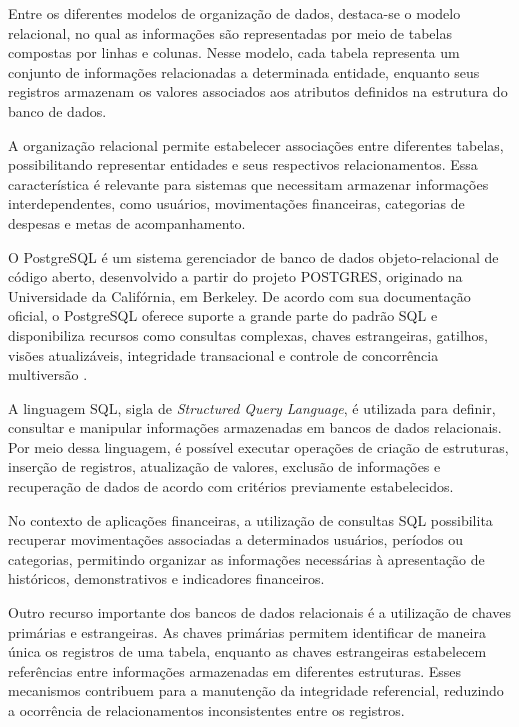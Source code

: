 Entre os diferentes modelos de organização de dados, destaca-se o modelo relacional, no qual as informações são representadas por meio de tabelas compostas por linhas e colunas. Nesse modelo, cada tabela representa um conjunto de informações relacionadas a determinada entidade, enquanto seus registros armazenam os valores associados aos atributos definidos na estrutura do banco de dados.

A organização relacional permite estabelecer associações entre diferentes tabelas, possibilitando representar entidades e seus respectivos relacionamentos. Essa característica é relevante para sistemas que necessitam armazenar informações interdependentes, como usuários, movimentações financeiras, categorias de despesas e metas de acompanhamento.

O PostgreSQL é um sistema gerenciador de banco de dados objeto-relacional de código aberto, desenvolvido a partir do projeto POSTGRES, originado na Universidade da Califórnia, em Berkeley. De acordo com sua documentação oficial, o PostgreSQL oferece suporte a grande parte do padrão SQL e disponibiliza recursos como consultas complexas, chaves estrangeiras, gatilhos, visões atualizáveis, integridade transacional e controle de concorrência multiversão \cite{postgresql_intro_2026}.

A linguagem SQL, sigla de \textit{Structured Query Language}, é utilizada para definir, consultar e manipular informações armazenadas em bancos de dados relacionais. Por meio dessa linguagem, é possível executar operações de criação de estruturas, inserção de registros, atualização de valores, exclusão de informações e recuperação de dados de acordo com critérios previamente estabelecidos.

No contexto de aplicações financeiras, a utilização de consultas SQL possibilita recuperar movimentações associadas a determinados usuários, períodos ou categorias, permitindo organizar as informações necessárias à apresentação de históricos, demonstrativos e indicadores financeiros.

Outro recurso importante dos bancos de dados relacionais é a utilização de chaves primárias e estrangeiras. As chaves primárias permitem identificar de maneira única os registros de uma tabela, enquanto as chaves estrangeiras estabelecem referências entre informações armazenadas em diferentes estruturas. Esses mecanismos contribuem para a manutenção da integridade referencial, reduzindo a ocorrência de relacionamentos inconsistentes entre os registros.

